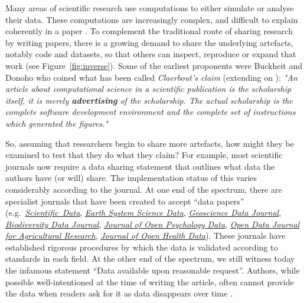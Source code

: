 \documentclass[12pt]{article}
\begin{document}
Many areas of scientific research use computations to either simulate
or analyse their data. These computations are increasingly complex, and
difficult to explain coherently in a paper \citep{marwick_how_2015}.
To complement the traditional route of sharing research by writing papers,
there is a growing demand to share the underlying artefacts, notably 
code and datasets, so that others can inspect, reproduce or expand that work
(see Figure~\ref{fig:inverse}).
Some of the earliest proponents were Buckheit and Donoho
\cite{buckheit_wavelab_1995} who coined what has been called 
\emph{Claerbout's claim} (extending on \citet{claerbout_electronic_1992}):
\emph{"An article about computational science in a scientific publication 
is  the scholarship itself, it is merely \textbf{advertising} of
the scholarship. The actual scholarship is the complete software development
environment and the complete set of instructions which generated the 
figures."}

So, assuming that researchers begin to share more artefacts, how might
they be examined to test that they do what they claim? For example,
most scientific journals now require a data sharing statement that
outlines what data the authors have (or will) share.
The implementation status of this varies considerably according to the
journal. At one end of the spectrum, there are specialist journals that
have been created to accept ``data papers''
(e.g.~\href{https://www.nature.com/sdata/}{\emph{Scientific~Data}}, 
\href{https://essd.copernicus.org/}{\emph{Earth System Science Data}}, 
\href{https://rmets.onlinelibrary.wiley.com/journal/20496060}{\emph{Geoscience Data Journal}},
\href{https://bdj.pensoft.net/}{\emph{Biodiversity Data Journal}},
\href{https://openpsychologydata.metajnl.com/}{\emph{Journal of Open Psychology Data}},
\href{https://odjar.org/}{\emph{Open Data Journal for Agricultural Research}},
\href{https://openhealthdata.metajnl.com}{\emph{Journal of Open Health Data}}).
These journals have established rigorous procedures by which
the data is validated according to standards in each field. At the
other end of the spectrum, we still witness today the infamous
statement ``Data available upon reasonable request''. Authors,
while possible well-intentioned at the time of writing the article,
often cannot provide the data when readers ask for
it as data disappears over time \cite{Vines2014-hf}.
\end{document}
